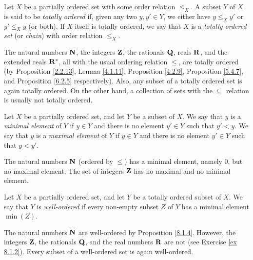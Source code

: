 \begin{definition}\label{8.5.3}
    Let \(X\) be a partially ordered set with some order relation \(\leq_X\).
    A subset \(Y\) of \(X\) is said to be \emph{totally ordered} if, given any two \(y, y' \in Y\), we either have \(y \leq_X y'\) or \(y' \leq_X y\) (or both).
    If \(X\) itself is totally ordered, we say that \(X\) is a \emph{totally ordered set} (or \emph{chain}) with order relation \(\leq_X\).
\end{definition}

\begin{example}\label{8.5.4}
    The natural numbers \(\mathbf{N}\), the integers \(\mathbf{Z}\), the rationals \(\mathbf{Q}\), reals \(\mathbf{R}\), and the extended reals \(\mathbf{R}^*\), all with the usual ordering relation \(\leq\), are totally ordered
    (by Proposition \ref{2.2.13}, Lemma \ref{4.1.11}, Proposition \ref{4.2.9}, Proposition \ref{5.4.7}, and Proposition \ref{6.2.5} respectively).
    Also, any subset of a totally ordered set is again totally ordered. On the other hand, a collection of sets with the \(\subseteq\) relation is usually not totally ordered.
\end{example}

\begin{definition}\label{8.5.5}
    Let \(X\) be a partially ordered set, and let \(Y\) be a subset of \(X\).
    We say that \(y\) is a \emph{minimal element} of \(Y\) if \(y \in Y\) and there is no element \(y' \in Y\) such that \(y' < y\).
    We say that \(y\) is a \emph{maximal element} of \(Y\) if \(y \in Y\) and there is no element \(y' \in Y\) such that \(y < y'\).
\end{definition}

\setcounter{theorem}{6}
\begin{example}\label{8.5.7}
    The natural numbers \(\mathbf{N}\) (ordered by \(\leq\)) has a minimal element, namely \(0\), but no maximal element.
    The set of integers \(\mathbf{Z}\) has no maximal and no minimal element.
\end{example}

\begin{definition}\label{8.5.8}
    Let \(X\) be a partially ordered set, and let \(Y\) be a totally ordered subset of \(X\).
    We say that \(Y\) is \emph{well-ordered} if every non-empty subset \(Z\) of \(Y\) has a minimal element \(\min(Z)\).
\end{definition}

\begin{example}\label{8.5.9}
    The natural numbers \(\mathbf{N}\) are well-ordered by Proposition \ref{8.1.4}.
    However, the integers \(\mathbf{Z}\), the rationals \(\mathbf{Q}\), and the real numbers \(\mathbf{R}\) are not (see Exercise \ref{ex 8.1.2}).
    Every subset of a well-ordered set is again well-ordered.
\end{example}

